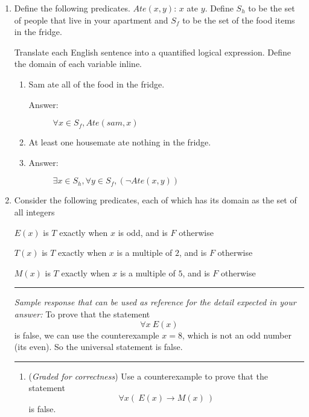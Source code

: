 \documentclass[12pt, oneside]{article}
\begin{document}
\begin{enumerate}
\item Define the following predicates.
    $Ate(x, y)$: $x$ ate $y$.
Define  $S_h$ to be the set of people that live in your apartment and $S_f$ to be the  set of the food items in the fridge.

Translate each English sentence into a quantified logical expression. Define the domain of each variable inline.
\begin{enumerate}
    \item Sam ate all of the food in the fridge.
    \begin{description}
        \item[Answer:] $\forall x \in S_f, Ate(sam, x)$
    \end{description}
    \item At least one housemate ate nothing in the fridge.
    \item \begin{description}
        \item[Answer:] $\exists x \in S_h, \forall y \in S_f, (\lnot Ate(x,y))$
    \end{description}
\end{enumerate}



\item Consider the following predicates, each of which has its domain as the set of all integers
\label{q5}

$E(x)$ is $T$ exactly when $x$ is odd, and is $F$ otherwise

$T(x)$ is $T$ exactly when $x$ is a multiple of $2$, and is $F$ otherwise

$M(x)$ is $T$ exactly when $x$ is a multiple of $5$, and is $F$ otherwise


\rule{0.5\textwidth}{.4pt}

{\it Sample response that can be used as reference for the detail expected 
in your answer:} To prove that the statement $$\forall x ~E(x)$$ is false, we can use 
the counterexample $x = 8$, which is not an odd number (its even).
So the universal statement is false.


\rule{0.5\textwidth}{.4pt}



\begin{enumerate}
\item ({\it Graded for correctness}) Use a counterexample to prove that the statement
\[
\forall x ( ~E(x) \to M(x) ~)
\]
is false.


\end{enumerate}
\end{enumerate}
\end{document}
